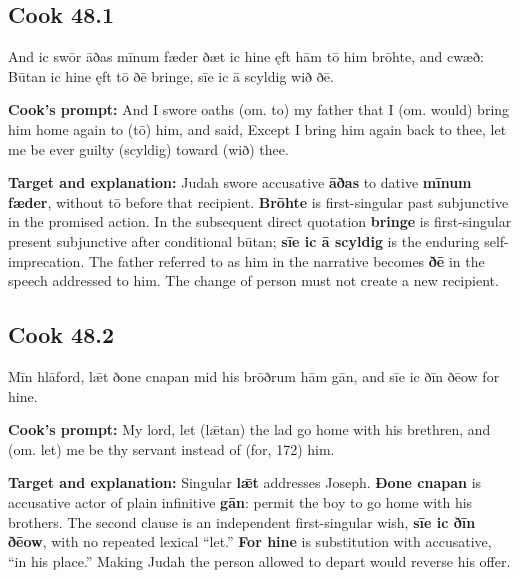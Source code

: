 \par\begin{minipage}{\linewidth}\raggedright
\subsection*{Cook 48.1}

And ic swōr āðas mīnum fæder ðæt ic hine ęft hām tō him brōhte, and cwæð: Būtan ic hine ęft tō ðē bringe, sīe ic ā scyldig wið ðē.

\textbf{Cook’s prompt:} And I swore oaths (om. to) my father that I (om. would) bring him home again to (tō) him, and said, Except I bring him again back to thee, let me be ever guilty (scyldig) toward (wið) thee.

\textbf{Target and explanation:} Judah swore accusative \textbf{āðas} to dative \textbf{mīnum fæder}, without tō before that recipient. \textbf{Brōhte} is first-singular past subjunctive in the promised action. In the subsequent direct quotation \textbf{bringe} is first-singular present subjunctive after conditional būtan; \textbf{sīe ic ā scyldig} is the enduring self-imprecation. The father referred to as him in the narrative becomes \textbf{ðē} in the speech addressed to him. The change of person must not create a new recipient.

\end{minipage}\par\addvspace{4pt}

\par\begin{minipage}{\linewidth}\raggedright
\subsection*{Cook 48.2}

Mīn hlāford, lǣt ðone cnapan mid his brōðrum hām gān, and sīe ic ðīn ðēow for hine.

\textbf{Cook’s prompt:} My lord, let (lǣtan) the lad go home with his brethren, and (om. let) me be thy servant instead of (for, 172) him.

\textbf{Target and explanation:} Singular \textbf{lǣt} addresses Joseph. \textbf{Ðone cnapan} is accusative actor of plain infinitive \textbf{gān}: permit the boy to go home with his brothers. The second clause is an independent first-singular wish, \textbf{sīe ic ðīn ðēow}, with no repeated lexical “let.” \textbf{For hine} is substitution with accusative, “in his place.” Making Judah the person allowed to depart would reverse his offer.

\end{minipage}\par\addvspace{4pt}

